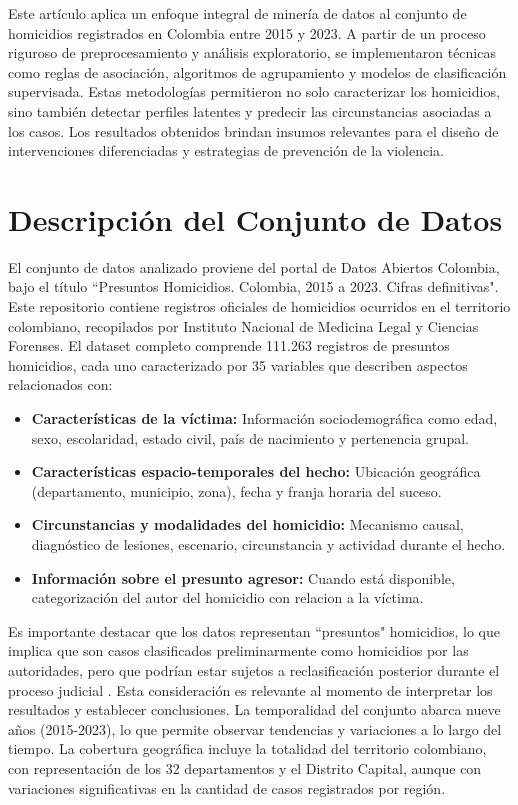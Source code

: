 \documentclass[lettersize,journal]{IEEEtran}
\begin{document}
Este artículo aplica un enfoque integral de minería de datos al conjunto de homicidios registrados en Colombia entre 2015 y 2023. A partir de un proceso riguroso de preprocesamiento y análisis exploratorio, se implementaron técnicas como reglas de asociación, algoritmos de agrupamiento y modelos de clasificación supervisada. Estas metodologías permitieron no solo caracterizar los homicidios, sino también detectar perfiles latentes y predecir las circunstancias asociadas a los casos. Los resultados obtenidos brindan insumos relevantes para el diseño de intervenciones diferenciadas y estrategias de prevención de la violencia.

\section{Descripción del Conjunto de Datos}
El conjunto de datos analizado proviene del portal de Datos Abiertos Colombia, bajo el título ``Presuntos Homicidios. Colombia, 2015 a 2023. Cifras definitivas". Este repositorio contiene registros oficiales de homicidios ocurridos en el territorio colombiano, recopilados por Instituto Nacional de Medicina Legal y Ciencias Forenses.
El dataset completo comprende 111.263 registros de presuntos homicidios, cada uno caracterizado por 35 variables que describen aspectos relacionados con:
\begin{itemize}
\item \textbf{Características de la víctima:} Información sociodemográfica como edad, sexo, escolaridad, estado civil, país de nacimiento y pertenencia grupal.
\item \textbf{Características espacio-temporales del hecho:} Ubicación geográfica (departamento, municipio, zona), fecha y franja horaria del suceso.
\item \textbf{Circunstancias y modalidades del homicidio:} Mecanismo causal, diagnóstico de lesiones, escenario, circunstancia y actividad durante el hecho.
\item \textbf{Información sobre el presunto agresor:} Cuando está disponible, categorización del autor del homicidio con relacion a la víctima.
\end{itemize}
Es importante destacar que los datos representan ``presuntos" homicidios, lo que implica que son casos clasificados preliminarmente como homicidios por las autoridades, pero que podrían estar sujetos a reclasificación posterior durante el proceso judicial \cite{Datos2023}. Esta consideración es relevante al momento de interpretar los resultados y establecer conclusiones.
La temporalidad del conjunto abarca nueve años (2015-2023), lo que permite observar tendencias y variaciones a lo largo del tiempo. La cobertura geográfica incluye la totalidad del territorio colombiano, con representación de los 32 departamentos y el Distrito Capital, aunque con variaciones significativas en la cantidad de casos registrados por región.
\end{document}
